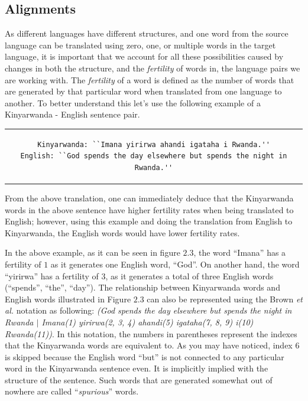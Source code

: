 \subsection{Alignments}

As different languages have different structures, and one word from the source language can be translated using zero, one, or multiple words in the target language, it is important that we account for all these possibilities caused by changes in both the structure, and the \textit{fertility} of words in, the language pairs we are working with. The \textit{fertility} of a word is defined as the number of words that are generated by that particular word  when translated from one language to another. To better understand this let's use the following example of a Kinyarwanda - English sentence pair. 
\begin{center}
\begin{tabular}{c}
\begin{lstlisting}
Kinyarwanda: ``Imana yirirwa ahandi igataha i Rwanda.''
English: ``God spends the day elsewhere but spends the night in Rwanda.''
\end{lstlisting}
\end{tabular}
\end{center}

From the above translation, one can immediately deduce that the Kinyarwanda words in the above sentence have higher fertility rates when being translated to English;  however, using this example and doing the translation from English to Kinyarwanda, the English words would have lower fertility rates. 

In the above example, as it can be seen in figure $2.3$, the word ``Imana'' has a fertility of $1$ as it generates one English word, ``God''. On another hand, the word ``yirirwa'' has a fertility of $3$, as it generates a total of three English words (``spends'', ``the'', ``day''). The relationship between Kinyarwanda words and English words illustrated in Figure $2.3$ can also be represented using the Brown \textit{et al.} notation\cite[p. 266]{brown1993mathematics} as following: \textit{(God spends the day elsewhere but spends the night in Rwanda $|$ Imana(1) yirirwa(2, 3, 4) ahandi(5) igataha(7, 8, 9) i(10) Rwanda(11))}. 
In this notation, the numbers in parentheses represent the indexes that the Kinyarwanda words are equivalent to. As you may have noticed, index $6$ is skipped because the English word ``but'' is not connected to any particular word in the Kinyarwanda sentence even.  It is implicitly implied with the structure of the sentence. Such words that are generated somewhat out of nowhere are called ``\textit{spurious}'' words\cite[p. 2]{Germann:2003:GDS:1073445.1073455}.  

